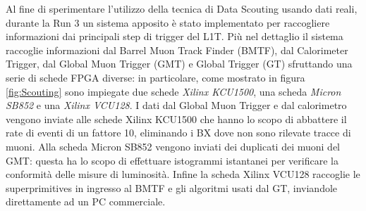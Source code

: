 Al fine di sperimentare l'utilizzo della tecnica di Data Scouting usando dati reali, durante la Run 3 un sistema apposito è stato implementato per raccogliere informazioni dai principali step di trigger del L1T. Più nel dettaglio il sistema raccoglie informazioni dal Barrel Muon Track Finder (BMTF), dal Calorimeter Trigger, dal Global Muon Trigger (GMT) e Global Trigger (GT) sfruttando una serie di schede FPGA diverse: in particolare, come mostrato in figura \ref{fig:Scouting} sono impiegate due schede \textit{Xilinx KCU1500}, una scheda \textit{Micron SB852} e una \textit{Xilinx VCU128}. \newline
I dati dal Global Muon Trigger e dal calorimetro vengono inviate alle schede Xilinx KCU1500 che hanno lo scopo di abbattere il rate di eventi di un fattore 10, eliminando i BX dove non sono rilevate tracce di muoni. Alla scheda Micron SB852 vengono inviati dei duplicati dei muoni del GMT: questa ha lo scopo di effettuare istogrammi istantanei per verificare la conformità delle misure di luminosità. Infine la scheda Xilinx VCU128 raccoglie le superprimitives in ingresso al BMTF e gli algoritmi usati dal GT, inviandole direttamente ad un PC commerciale.
